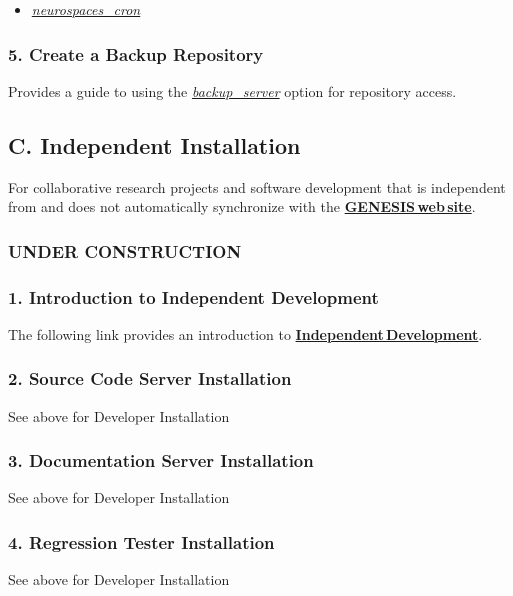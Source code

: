 \documentclass[12pt]{article}
\begin{document}
\begin{itemize}
   \item[]\href{../neurospaces-cron/neurospaces-cron.tex}{\it neurospaces\_cron}
\end{itemize}

\subsubsection*{5. Create a Backup Repository}

Provides a guide to using the \href{../backup-repository/backup-repository.tex}{\it backup\_server} option for repository access.

\subsection*{C. Independent Installation}

For collaborative research projects and software development that is independent from and does not automatically synchronize with the \href{http://www.genesis-sim.org/}{\bf GENESIS\,web\,site}.

\subsubsection*{UNDER CONSTRUCTION}

\subsubsection*{1. Introduction to Independent Development}

The following link provides an introduction to \href{../developer-intro/developer-intro.tex}{\bf Independent\,Development}.

\subsubsection*{2. Source Code Server Installation}

See above for Developer Installation

\subsubsection*{3. Documentation Server Installation}

See above for Developer Installation

\subsubsection*{4. Regression Tester Installation}

See above for Developer Installation
\end{document}

